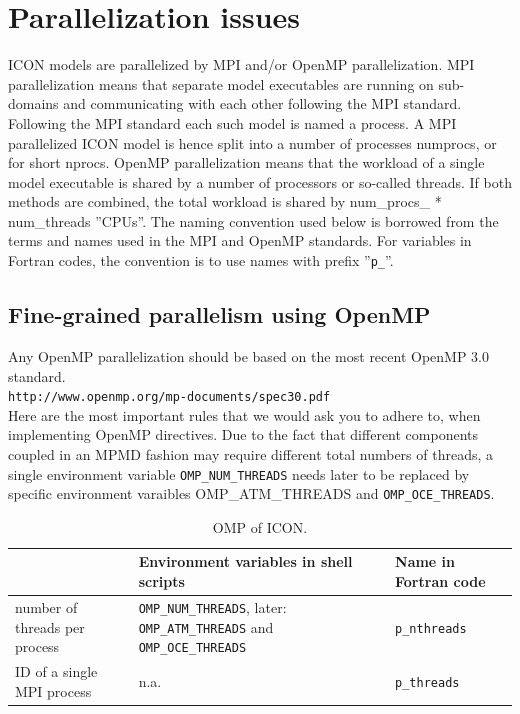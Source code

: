 \documentclass[a4paper,11pt,DIV16,BCOR1cm,titlepage]{scrartcl}
\begin{document}
\section{Parallelization issues}
%
ICON models are parallelized by MPI and/or OpenMP parallelization. MPI parallelization 
means that separate model executables are running on sub-domains and communicating 
with each other following the MPI standard. Following the MPI standard each such model 
is named a process. A MPI parallelized ICON model is hence split into a number of processes 
numprocs, or for short nprocs.
%
OpenMP parallelization means that the workload of a single model executable is shared by a 
number of processors or so-called threads. If both methods are combined, the total workload is 
shared by num\_procs\_ * num\_threads ''CPUs''.
The naming convention used below is borrowed from the terms and names used in the MPI and 
OpenMP standards. For variables in Fortran codes, the convention is to use names with prefix 
''\texttt{p\_}''.\\
%
\subsection{Fine-grained parallelism using OpenMP}
%
Any OpenMP parallelization should be based on the most recent OpenMP 3.0 standard. \\
{\color{blue}
\texttt{http://www.openmp.org/mp-documents/spec30.pdf} }\\
Here are the most important rules that we would ask you to adhere to, when 
implementing OpenMP directives.
%
Due to the fact that different components coupled in an MPMD fashion may require different total 
numbers of threads, a single environment variable \texttt{OMP\_NUM\_THREADS} needs later to 
be replaced by specific environment varaibles OMP\_ATM\_THREADS and 
\texttt{OMP\_OCE\_THREADS}.

\begin{table}[htb]
\renewcommand{\arraystretch}{1.4}
\begin{center}
\begin{tabular}{|p{5cm}|p{7 cm}|p{3cm}|}
\hline
\textbf{ }  & \textbf{Environment variables in shell scripts}  & \textbf{Name in Fortran code} \\ 
\hline\hline
number of threads per process & \texttt{OMP\_NUM\_THREADS}, later: \texttt{OMP\_ATM\_THREADS} and \texttt{OMP\_OCE\_THREADS} & \texttt{p\_nthreads} \\ 
ID of a single MPI process     & n.a. & \texttt{p\_threads} \\ 
\hline
\end{tabular}
\caption{OMP of ICON.}\label{tbl_OMP}
\end{center}
\end{table}
\end{document}
